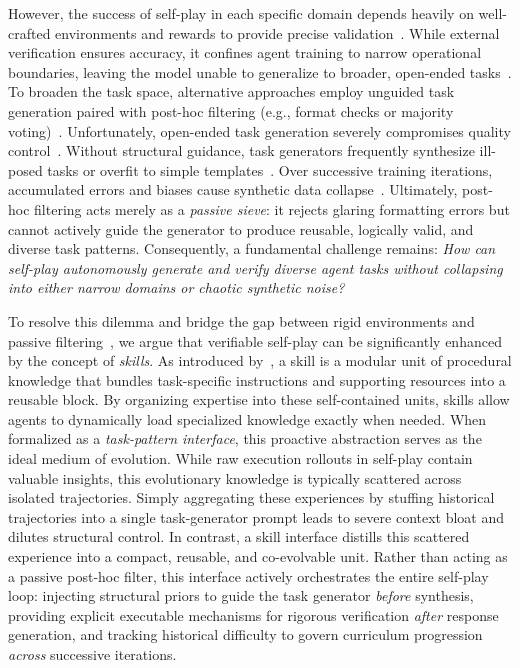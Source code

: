 However, the success of self-play in each specific domain depends heavily on well-crafted environments and rewards to provide precise validation~\citep{yang2026self,song2026envscaler,yan2026openskill,huang2026ace,wang2026code}. 
While external verification ensures accuracy, it confines agent training to narrow operational boundaries, leaving the model unable to generalize to broader, open-ended tasks~\citep{tang2025beyond,zhao2025learning}. 
To broaden the task space, alternative approaches employ unguided task generation paired with post-hoc filtering (e.g., format checks or majority voting)~\citep{wang2023self,xu2024wizardlm,nguyen2024better,xu2025magpie,an2025ultraif,yu2025cot}. 
Unfortunately, open-ended task generation severely compromises quality control~\citep{long2024llms,jiang2025self}. 
Without structural guidance, task generators frequently synthesize ill-posed tasks or overfit to simple templates~\citep{yu2025guided,li2026r}.
Over successive training iterations, accumulated errors and biases cause synthetic data collapse~\citep{shumailov2024ai,kazdan2025collapse}.
Ultimately, post-hoc filtering acts merely as a \emph{passive sieve}: it rejects glaring formatting errors but cannot actively guide the generator to produce reusable, logically valid, and diverse task patterns. 
Consequently, a fundamental challenge remains: \emph{How can self-play autonomously generate and verify diverse agent tasks without collapsing into either narrow domains or chaotic synthetic noise?}



To resolve this dilemma and bridge the gap between rigid environments and passive filtering~\citep{khattab2023dspy,dong2025self,prabhakar2026apigen,gao2026self}, we argue that verifiable self-play can be significantly enhanced by the concept of \emph{skills}. 
As introduced by~\citet{claudeIntroducingAgent}, a skill is a modular unit of procedural knowledge that bundles task-specific instructions and supporting resources into a reusable block. By organizing expertise into these self-contained units, skills allow agents to dynamically load specialized knowledge exactly when needed.
When formalized as a \emph{task-pattern interface}, this proactive abstraction serves as the ideal medium of evolution. 
While raw execution rollouts in self-play contain valuable insights, this evolutionary knowledge is typically scattered across isolated trajectories. 
Simply aggregating these experiences by stuffing historical trajectories into a single task-generator prompt leads to severe context bloat and dilutes structural control. 
In contrast, a skill interface distills this scattered experience into a compact, reusable, and co-evolvable unit. 
Rather than acting as a passive post-hoc filter, this interface actively orchestrates the entire self-play loop: injecting structural priors to guide the task generator \emph{before} synthesis, providing explicit executable mechanisms for rigorous verification \emph{after} response generation, and tracking historical difficulty to govern curriculum progression \emph{across} successive iterations.





